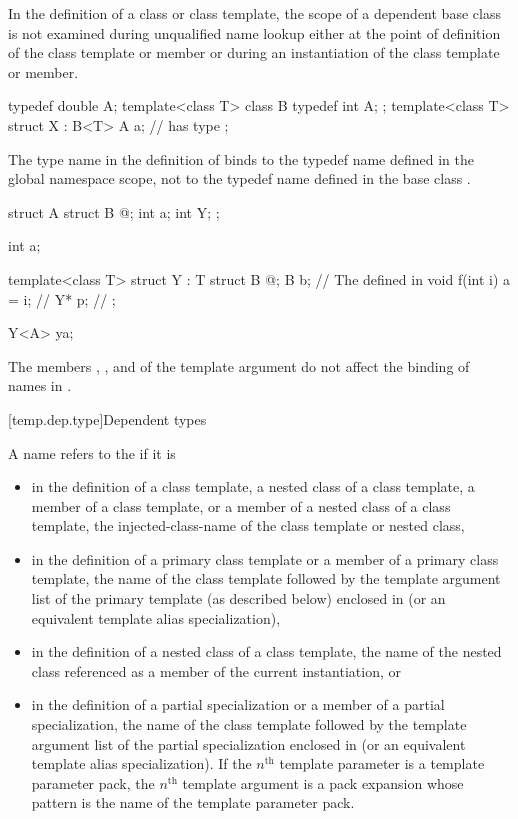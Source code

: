 \pnum
In the definition of a class or class template,
the scope of a dependent base class
is not examined during unqualified
name lookup either at the point of definition of the
class template or member or during an instantiation of
the class template or member.
\begin{example}
\begin{codeblock}
typedef double A;
template<class T> class B {
  typedef int A;
};
template<class T> struct X : B<T> {
  A a;              //  has type 
};
\end{codeblock}

The type name
in the definition of
binds to the typedef name defined in the global
namespace scope, not to the typedef name
defined in the base class
.
\end{example}
\begin{example}
\begin{codeblock}
struct A {
  struct B { @\commentellip@ };
  int a;
  int Y;
};

int a;

template<class T> struct Y : T {
  struct B { @\commentellip@ };
  B b;                          // The  defined in 
  void f(int i) { a = i; }      // 
  Y* p;                         // 
};

Y<A> ya;
\end{codeblock}

The members
,
,
and
of the template argument
do not affect the binding of names in
.
\end{example}

[temp.dep.type]{Dependent types}

\pnum
A name refers to the
if it is
\begin{itemize}
\item
in the definition of a class template, a nested class of a class template,
a member of a class template, or a member of a nested class of a class template,
the injected-class-name of the class template or nested class,
\item
in the definition of a primary class template
or a member of a primary class template, the name of the
class template followed by the template argument list of the
primary template (as described below) enclosed in
\tcode{<>} (or an equivalent template alias specialization),
\item
in the definition of a nested class of a class template,
the name of the nested class referenced as a member of the
current instantiation, or
\item
in the definition of a partial specialization
or a member of a partial specialization, the name of
the class template followed by the template argument list of
the partial specialization enclosed in
\tcode{<>} (or an equivalent template alias specialization).
If the $n^\text{th}$ template parameter is
a template parameter pack, the $n^\text{th}$ template argument is a pack
expansion whose pattern is the name of
the template parameter pack.
\end{itemize}

